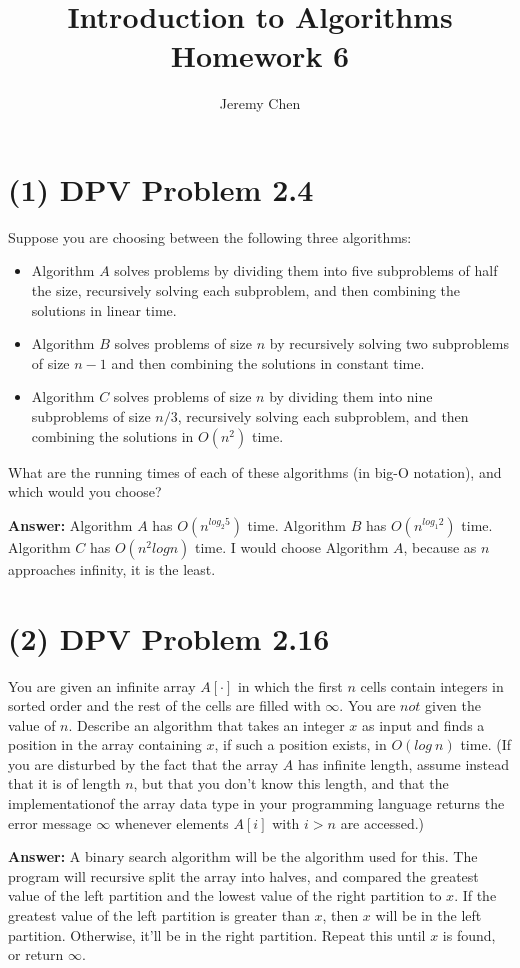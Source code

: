 \documentclass[10pt,letterpaper]{article}
\title{Introduction to Algorithms Homework 6}
\author{Jeremy Chen}
\begin{document}
	\maketitle
\section*{(1) DPV Problem 2.4}
\noindent Suppose you are choosing between the following three algorithms:
\begin{itemize}
	\item Algorithm $A$ solves problems by dividing them into five subproblems of half the size, recursively solving each subproblem, and then combining the solutions in linear time.
	\item Algorithm $B$ solves problems of size $n$ by recursively solving two subproblems of size $n - 1$ and then combining the solutions in constant time.
	\item Algorithm $C$ solves problems of size $n$ by dividing them into nine subproblems of size $n/3$, recursively solving each subproblem, and then combining the solutions in $O(n^{2})$ time.
\end{itemize}
What are the running times of each of these algorithms (in big-O notation), and which would you choose?

\textbf{Answer:} Algorithm $A$ has $O(n^{log_{2}5})$ time. Algorithm $B$ has $O(n^{log_{1}2})$ time. Algorithm $C$ has $O(n^{2}logn)$ time. I would choose Algorithm $A$, because as $n$ approaches infinity, it is the least.

\section*{(2) DPV Problem 2.16}
\noindent You are given an infinite array $A[\cdot]$ in which the first $n$ cells contain integers in sorted order and the rest of the cells are filled with $\infty$. You are $not$ given the value of $n$. Describe an algorithm that takes an integer $x$ as input and finds a position in the array containing $x$, if such a position exists, in $O(log\ n)$ time. (If you are disturbed by the fact that the array $A$ has infinite length, assume instead that it is of length $n$, but that you don't know this length, and that the implementationof the array data type in your programming language returns the error message $\infty$ whenever elements $A[i]$ with $i > n$ are accessed.)

\textbf{Answer:} A binary search algorithm will be the algorithm used for this. The program will recursive split the array into halves, and compared the greatest value of the left partition and the lowest value of the right partition to $x$. If the greatest value of the left partition is greater than $x$, then $x$ will be in the left partition. Otherwise, it'll be in the right partition. Repeat this until $x$ is found, or return $\infty$.
\end{document}
